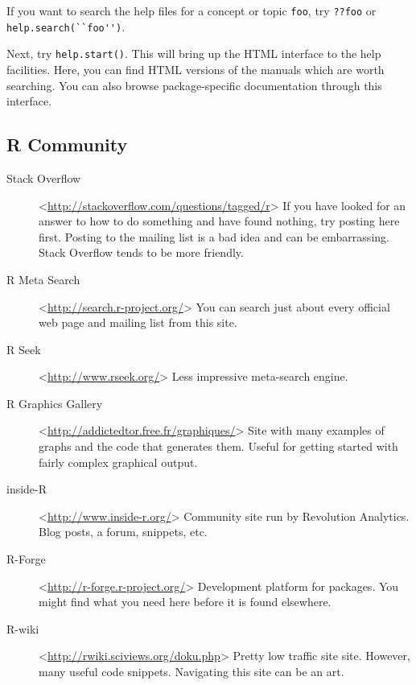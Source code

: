 If you want to search the \R{} help files for a concept or topic
\texttt{foo}, try \verb=??foo= or \verb=help.search(``foo'')=.

Next, try \texttt{help.start()}. This will bring up the HTML interface
to the help facilities. Here, you can find HTML versions of the \R{}
manuals which are worth searching. You can also browse
package-specific documentation through this interface.

\subsection{R Community}

\begin{description}
\item[Stack Overflow]
  <\url{http://stackoverflow.com/questions/tagged/r}> If you have
  looked for an answer to how to do something and have found nothing,
  try posting here first. Posting to the mailing list is a bad idea
  and can be embarrassing. Stack Overflow tends to be more friendly.

\item[R Meta Search] <\url{http://search.r-project.org/}> You can
  search just about every official web page and mailing list from this
  site.

\item[R Seek] <\url{http://www.rseek.org/}> Less impressive
  meta-search engine.

\item[R Graphics Gallery]
  <\url{http://addictedtor.free.fr/graphiques/}> Site with many
  examples of graphs and the code that generates them. Useful for
  getting started with fairly complex graphical output.

\item[inside-R] <\url{http://www.inside-r.org/}> Community site run by
  Revolution Analytics. Blog posts, a forum, snippets, etc.

\item[R-Forge] <\url{http://r-forge.r-project.org/}> Development
  platform for \R{} packages. You might find what you need here before
  it is found elsewhere.

\item[R-wiki] <\url{http://rwiki.sciviews.org/doku.php}> Pretty low
  traffic site site. However, many useful code snippets. Navigating
  this site can be an art.

\end{description}

